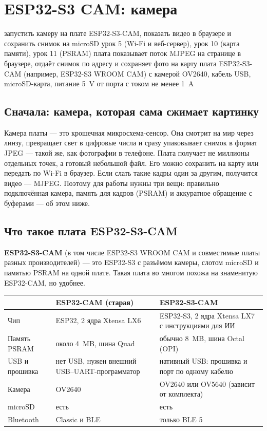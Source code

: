 \section{ESP32-S3 CAM: камера}
\lessonintro
  {запустить камеру на плате ESP32-S3-CAM, показать видео в браузере и сохранить снимок на microSD}
  {урок 5 (Wi-Fi и веб-сервер), урок 10 (карта памяти), урок 11 (PSRAM)}
  {плата показывает поток MJPEG на странице в браузере, отдаёт снимок по адресу  и сохраняет фото на карту}
  {плата ESP32-S3-CAM (например, ESP32-S3 WROOM CAM) с камерой OV2640, кабель USB, microSD-карта, питание \SI{5}{V} от порта с током не менее \SI{1}{A}}

\subsection{Сначала: камера, которая сама сжимает картинку}

Камера платы --- это крошечная микросхема-сенсор. Она смотрит на мир через линзу, превращает свет в
цифровые числа и сразу упаковывает снимок в формат JPEG --- такой же, как фотографии в телефоне. Плата
получает не миллионы отдельных точек, а готовый небольшой файл. Его можно сохранить на карту или передать
по Wi-Fi в браузер. Если слать такие кадры один за другим, получится видео --- MJPEG. Поэтому для работы
нужны три вещи: правильно подключённая камера, память для кадров (PSRAM) и аккуратное обращение с
буферами --- об этом ниже.

\subsection{Что такое плата ESP32-S3-CAM}

\textbf{ESP32-S3-CAM} (в том числе ESP32-S3 WROOM CAM и совместимые платы разных производителей) --- это
ESP32-S3 с разъёмом камеры, слотом microSD и памятью PSRAM на одной плате. Такая плата во многом похожа
на знаменитую ESP32-CAM, но удобнее.

\begin{center}\small
\begin{tabularx}{\textwidth}{@{}l X X@{}}
\toprule
 & ESP32-CAM (старая) & ESP32-S3-CAM \\
\midrule
Чип & ESP32, 2 ядра Xtensa LX6 & ESP32-S3, 2 ядра Xtensa LX7 с инструкциями для ИИ \\
Память PSRAM & около \SI{4}{MB}, шина Quad & обычно \SI{8}{MB}, шина Octal (OPI) \\
USB и прошивка & нет USB, нужен внешний USB--UART-программатор & нативный USB: прошивка и порт по одному кабелю \\
Камера & OV2640 & OV2640 или OV5640 (зависит от комплекта) \\
microSD & есть & есть \\
Bluetooth & Classic и BLE & только BLE 5 \\
\bottomrule
\end{tabularx}
\end{center}

